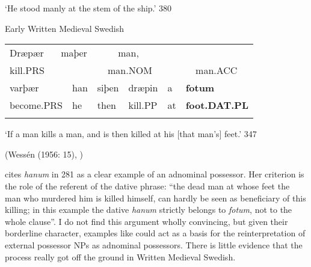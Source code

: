 \begin{styleTranslation}
‘He stood manly at the stem of the ship.’ 380

\end{styleTranslation}

\begin{styleExLtrTblii}
\label{bkm:Ref95296719}Early Written Medieval Swedish

\end{styleExLtrTblii}

\begin{tabular}{lllllllllll}
\lsptoprule
Dræpær & \multicolumn{4}{l}{maþer

} & \multicolumn{5}{l}{man,

} & \\
\multicolumn{4}{l}{kill.PRS

} & \multicolumn{5}{l}{man.NOM

} & man.ACC & \\
\multicolumn{2}{l}{varþær

} & han & \multicolumn{3}{l}{siþen

} & dræpin & a & \multicolumn{3}{l}{{\bfseries fotum}

}\\
\multicolumn{2}{l}{become.PRS

} & he & \multicolumn{3}{l}{then

} & kill.PP & at & \multicolumn{3}{l}{{\bfseries foot.DAT.PL}

}\\
\lspbottomrule
\end{tabular}

\begin{styleTranslation}
‘If a man kills a man, and is then killed at his [that man’s] feet.’ 347

\end{styleTranslation}

\begin{styleBodyTextFirst}
(Wessén (1956: 15), \citet[211]{Norde1997})

\end{styleBodyTextFirst}

\begin{styleBodyTextFirst}
\citet[212]{Norde1997} cites \textit{hanum }in 281 as a clear example of an adnominal possessor. Her criterion is the role of the referent of the dative phrase: “the dead man at whose feet the man who murdered him is killed himself, can hardly be seen as beneficiary of this killing; in this example the dative \textit{hanum} strictly belongs to \textit{fotum}, not to the whole clause”. I do not find this argument wholly convincing, but given their borderline character, examples like  could act as a basis for the reinterpretation of external possessor NPs as adnominal possessors. There is little evidence that the process really got off the ground in Written Medieval Swedish.

\end{styleBodyTextFirst}

